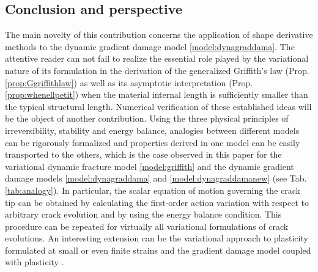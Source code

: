 \subsection{Conclusion and perspective}
The main novelty of this contribution concerns the application of shape derivative methods \cite{KhludnevSokolowskiSzulc:2010} to the dynamic gradient damage model \ref{model:dynagraddama}. The attentive reader can not fail to realize the essential role played by the variational nature of its formulation in the derivation of the generalized Griffith's law (Prop. \ref{prop:Ggriffithlaw}) as well as its asymptotic interpretation (Prop. \ref{prop:whenellpetit}) when the material internal length is sufficiently smaller than the typical structural length. Numerical verification of these established ideas will be the object of another contribution. Using the three physical principles of irreversibility, stability and energy balance, analogies between different models can be rigorously formalized and properties derived in one model can be easily transported to the others, which is the case observed in this paper for the variational dynamic fracture model \ref{model:griffith} and the dynamic gradient damage models \ref{model:dynagraddama} and \ref{model:dynagraddamanew} (see Tab. \ref{tab:analogy}). In particular, the scalar equation of motion governing the crack tip can be obtained by calculating the first-order action variation with respect to arbitrary crack evolution and by using the energy balance condition. This procedure can be repeated for virtually all variational formulations of crack evolutions. An interesting extension can be the variational approach to plasticity formulated at small \cite{Dal-Maso:2006} or even finite strains \cite{Davoli:2015} and the gradient damage model coupled with plasticity \cite{AlessiMarigoVidoli:2015}.
